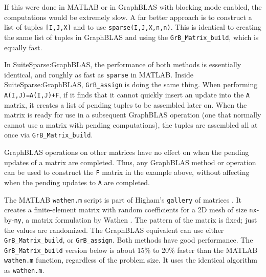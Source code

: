 \documentclass[12pt]{article}
\begin{document}
If this were done in MATLAB or in GraphBLAS with blocking mode enabled, the
computations would be extremely slow.  A far better approach is to construct a
list of tuples \verb'[I,J,X]' and to use \verb'sparse(I,J,X,n,n)'. This is
identical to creating the same list of tuples in GraphBLAS and using the
\verb'GrB_Matrix_build', which is equally fast.

In SuiteSparse:GraphBLAS, the performance of both methods is essentially
identical, and roughly as fast as \verb'sparse' in MATLAB.  Inside
SuiteSparse:GraphBLAS, \verb'GrB_assign' is doing the same thing. When
performing \verb'A(I,J)=A(I,J)+F', if it finds that it cannot quickly insert an
update into the \verb'A' matrix, it creates a list of pending tuples to be
assembled later on.   When the matrix is ready for use in a subsequent
GraphBLAS operation (one that normally cannot use a matrix with pending
computations), the tuples are assembled all at once via
\verb'GrB_Matrix_build'.

GraphBLAS operations on other matrices have no effect on when the pending
updates of a matrix are completed.  Thus, any GraphBLAS method or operation can
be used to construct the \verb'F' matrix in the example above, without
affecting when the pending updates to \verb'A' are completed.

The MATLAB \verb'wathen.m' script is part of Higham's \verb'gallery' of
matrices \cite{Higham}.  It creates a finite-element matrix with random
coefficients for a 2D mesh of size \verb'nx'-by-\verb'ny', a matrix formulation
by Wathen \cite{Wathen}.  The pattern of the matrix is fixed; just the values
are randomized.  The GraphBLAS equivalent can use either
\verb'GrB_Matrix_build', or \verb'GrB_assign'.  Both methods have good
performance.  The \verb'GrB_Matrix_build' version below is about 15\% to 20\%
faster than the MATLAB \verb'wathen.m' function, regardless of the problem
size.  It uses the identical algorithm as \verb'wathen.m'.
\end{document}
